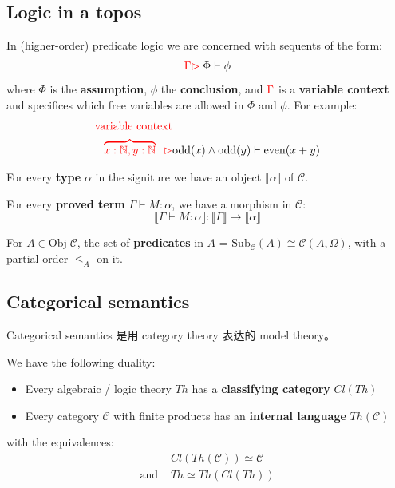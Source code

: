 \documentclass[12pt, orivec]{article}
\newcommand{\cc}[2]{#1}
\newcommand{\cc}[2]{#2}
\begin{document}
\subsection{Logic in a topos}

In (higher-order) predicate logic we are concerned with sequents of the form:
\begin{equation}
{\color{red} \Gamma \rhd } \; \Phi \vdash \phi
\end{equation}
where $\Phi$ is the \textbf{assumption}, $\phi$ the \textbf{conclusion}, and ${\color{red} \Gamma}$ is a \textbf{variable context} and specifices which free variables are allowed in $\Phi$ and $\phi$.  For example:
\begin{eqnarray}
{\color{red}\mbox{variable context}} & \nonumber \\
{\color{red} \overbrace{ x: \mathbb{N}, y: \mathbb{N} } \;\; \rhd } & \mathrm{odd}(x) \wedge \mathrm{odd}(y) \vdash \mathrm{even}(x + y)
\end{eqnarray}

For every \textbf{type} $\alpha$ in the signiture we have an object $\llbracket \alpha \rrbracket$ of $\mathscr{C}$.

For every \textbf{proved term} $\Gamma \vdash M : \alpha$, we have a morphism in $\mathscr{C}$:
\begin{equation}
\llbracket \Gamma \vdash M : \alpha \rrbracket : \llbracket \Gamma \rrbracket \rightarrow \llbracket \alpha \rrbracket
\end{equation}

For $A \in \mathrm{Obj} \; \mathscr{C}$, the set of \textbf{predicates} in $A$ = $\mathrm{Sub}_{\mathscr{C}}(A) \cong \mathscr{C}(A, \Omega)$, with a partial order $\le_A$ on it.

\subsection{Categorical semantics}

\cc{Categorical semantics 是用 category theory 表达的 model theory。
}{
Categorical semantics is model theory expressed in category theory.}

We have the following duality:
\begin{itemize}
\item Every algebraic / logic theory $Th$ has a \textbf{classifying category} $Cl(Th)$
\item Every category $\mathscr{C}$ with finite products has an \textbf{internal language} $Th(\mathscr{C})$
\end{itemize}
with the equivalences:
\begin{eqnarray}
& Cl(Th(\mathscr{C})) \simeq \mathscr{C} \nonumber \\
\mbox{and } & Th \simeq Th(Cl(Th))
\end{eqnarray}
\end{document}
